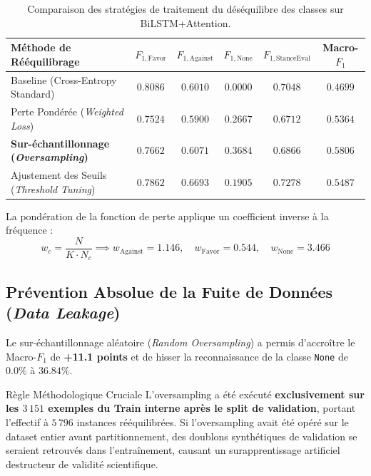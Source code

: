 \documentclass[11pt,a4paper]{article}
\begin{document}
\begin{table}[htbp]
\centering
\caption{Comparaison des stratégies de traitement du déséquilibre des classes sur BiLSTM+Attention.}
\label{tab:imbalance}
\begin{tabularx}{\textwidth}{lccccc}
\toprule
\textbf{Méthode de Rééquilibrage} & \textbf{$F_{1,\text{Favor}}$} & \textbf{$F_{1,\text{Against}}$} & \textbf{$F_{1,\text{None}}$} & \textbf{$F_{1,\text{StanceEval}}$} & \textbf{Macro-$F_1$} \\
\midrule
Baseline (Cross-Entropy Standard) & $0.8086$ & $0.6010$ & $\mathbf{0.0000}$ & $\mathbf{0.7048}$ & $0.4699$ \\
Perte Pondérée (\textit{Weighted Loss}) & $0.7524$ & $0.5900$ & $0.2667$ & $0.6712$ & $0.5364$ \\
\textbf{Sur-échantillonnage (\textit{Oversampling})} & $0.7662$ & $0.6071$ & $\mathbf{0.3684}$ & $0.6866$ & $\mathbf{0.5806}$ \\
Ajustement des Seuils (\textit{Threshold Tuning}) & $0.7862$ & $0.6693$ & $0.1905$ & $\mathbf{0.7278}$ & $0.5487$ \\
\bottomrule
\end{tabularx}
\end{table}

La pondération de la fonction de perte applique un coefficient inverse à la fréquence :
\begin{equation}
    w_c = \frac{N}{K \cdot N_c} \implies w_{\text{Against}} = 1.146, \quad w_{\text{Favor}} = 0.544, \quad w_{\text{None}} = 3.466
\end{equation}

\subsection{Prévention Absolue de la Fuite de Données (\textit{Data Leakage})}
Le sur-échantillonnage aléatoire (\textit{Random Oversampling}) a permis d'accroître le Macro-$F_1$ de \textbf{+11.1 points} et de hisser la reconnaissance de la classe \texttt{None} de $0.0\%$ à $36.84\%$. 
\begin{infobox}{Règle Méthodologique Cruciale}
L'oversampling a été exécuté \textbf{exclusivement sur les $3\,151$ exemples du Train interne après le split de validation}, portant l'effectif à $5\,796$ instances rééquilibrées. Si l'oversampling avait été opéré sur le dataset entier avant partitionnement, des doublons synthétiques de validation se seraient retrouvés dans l'entraînement, causant un surapprentissage artificiel destructeur de validité scientifique.
\end{infobox}
\end{document}
